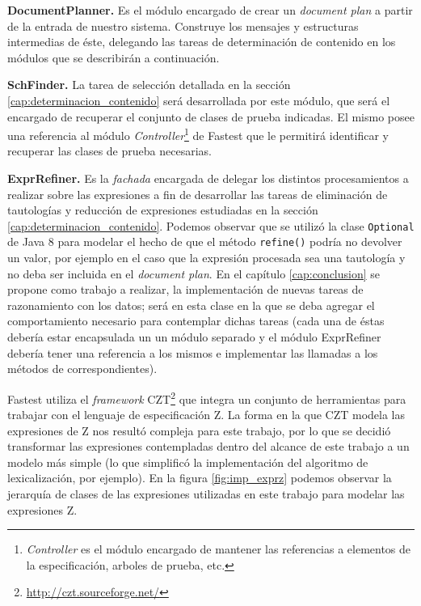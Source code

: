 \bigskip
\noindent
\textbf{DocumentPlanner.} Es el módulo encargado de crear un \textit{document plan} a partir de la entrada de nuestro sistema. Construye los mensajes y estructuras intermedias de éste, delegando las tareas de determinación de contenido en los módulos que se describirán a continuación.

\bigskip
\noindent
\textbf{SchFinder.} La tarea de selección detallada en la sección \ref{cap:determinacion_contenido} será desarrollada por este módulo, que será el encargado de recuperar el conjunto de clases de prueba indicadas. El mismo posee una referencia al módulo \textit{Controller}\footnote{\textit{Controller} es el módulo encargado de mantener las referencias a elementos de la especificación, arboles de prueba, etc.} de Fastest que le permitirá identificar y recuperar las clases de prueba necesarias. 


\bigskip
\noindent
\textbf{ExprRefiner.} Es la \textit{fachada} \cite{gof} encargada de delegar los distintos procesamientos a realizar sobre las expresiones a fin de desarrollar las tareas de eliminación de tautologías y reducción de expresiones estudiadas en la sección \ref{cap:determinacion_contenido}. Podemos observar que se utilizó la clase \texttt{Optional} de Java 8 para modelar el hecho de que el método \texttt{refine()} podría no devolver un valor, por ejemplo en el caso que la expresión procesada sea una tautología y no deba ser incluida en el \textit{document plan}. En el capítulo \ref{cap:conclusion} se propone como trabajo a realizar, la implementación de nuevas tareas de razonamiento con los datos; será en esta clase en la que se deba agregar el comportamiento necesario para contemplar dichas tareas (cada una de éstas debería estar encapsulada un un módulo separado y el módulo ExprRefiner debería tener una referencia a los mismos e implementar las llamadas a los métodos de correspondientes).

\bigskip
Fastest utiliza el \textit{framework} CZT\footnote{\url{http://czt.sourceforge.net/}} que integra un conjunto de herramientas para trabajar con el lenguaje de especificación Z. La forma en la que CZT modela las expresiones de Z nos resultó compleja para este trabajo, por lo que se decidió transformar las expresiones contempladas dentro del alcance de este trabajo a un modelo más simple (lo que simplificó la implementación del algoritmo de lexicalización, por ejemplo). En la figura \ref{fig:imp_exprz} podemos observar la jerarquía de clases de las expresiones utilizadas en este trabajo para modelar las expresiones Z. 

